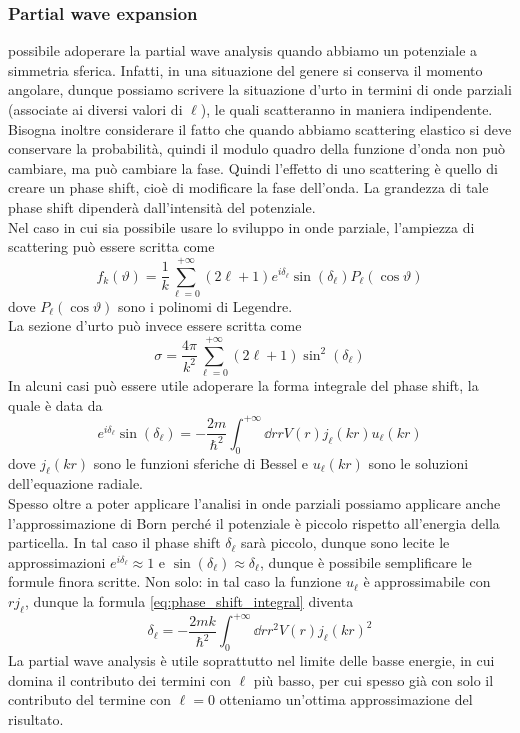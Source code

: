 \subsubsection*{Partial wave expansion}
   \E possibile adoperare la partial wave analysis quando abbiamo un potenziale a simmetria sferica. Infatti, in una situazione del genere si conserva il momento angolare, dunque possiamo scrivere la situazione d'urto in termini di onde parziali (associate ai diversi valori di $\ell$), le quali scatteranno in maniera indipendente.\\
   Bisogna inoltre considerare il fatto che quando abbiamo scattering elastico si deve conservare la probabilità, quindi il modulo quadro della funzione d'onda non può cambiare, ma può cambiare la fase. Quindi l'effetto di uno scattering è quello di creare un phase shift, cioè di modificare la fase dell'onda. La grandezza di tale phase shift dipenderà dall'intensità del potenziale.\\
   Nel caso in cui sia possibile usare lo sviluppo in onde parziale, l'ampiezza di scattering può essere scritta come
   \begin{equation*}
      f_k(\vartheta)
      =\frac{1}{k} \sum_{\ell=0}^{+\infty} (2\ell + 1) e^{i \delta_{\ell}} \sin{(\delta_{\ell})} P_{\ell}(\cos{\vartheta})
   \end{equation*}
   dove $P_{\ell}(\cos{\vartheta})$ sono i polinomi di Legendre.\\
   La sezione d'urto può invece essere scritta come
   \begin{equation*}
      \sigma
      =\frac{4\pi}{k^2} \sum_{\ell=0}^{+\infty} (2\ell + 1) \sin^2{(\delta_{\ell})}
   \end{equation*}
   In alcuni casi può essere utile adoperare la forma integrale del phase shift, la quale è data da
   \begin{equation}
      e^{i \delta_{\ell}} \sin{(\delta_{\ell})}
      =-\frac{2m}{\hbar^2} \int_{0}^{+\infty} \dd{r} r V(r) j_{\ell}(kr) u_{\ell}(kr)
      \label{eq:phase_shift_integral}
   \end{equation}
   dove $j_{\ell}(kr)$ sono le funzioni sferiche di Bessel e $u_{\ell}(kr)$ sono le soluzioni dell'equazione radiale.\\
   Spesso oltre a poter applicare l'analisi in onde parziali possiamo applicare anche l'approssimazione di Born perché il potenziale è piccolo rispetto all'energia della particella. In tal caso il phase shift $\delta_{\ell}$ sarà piccolo, dunque sono lecite le approssimazioni $e^{i \delta_{\ell}} \approx 1$ e $\sin{(\delta_{\ell})} \approx \delta_{\ell}$, dunque è possibile semplificare le formule finora scritte. Non solo: in tal caso la funzione $u_{\ell}$ è approssimabile con $r j_{\ell}$, dunque la formula \eqref{eq:phase_shift_integral} diventa
   \begin{equation*}
      \delta_{\ell}
      =-\frac{2mk}{\hbar^2} \int_{0}^{+\infty} \dd{r} r^2 V(r) j_{\ell}(kr)^2
   \end{equation*}
   La partial wave analysis è utile soprattutto nel limite delle basse energie, in cui domina il contributo dei termini con $\ell$ più basso, per cui spesso già con solo il contributo del termine con $\ell=0$ otteniamo un'ottima approssimazione del risultato.